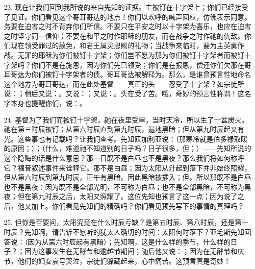 23. 现在让我们回到我所说的来自先知的证据。主被钉在十字架上；你们已经接受了见证。你们看见这个哥耳哥达的地点！你们以欢呼的喊声回应，仿佛表示同意。务要在迫害之时不背弃你们所信。不要只在平安之时以十字架为喜乐，也应在迫害之时坚守同一信仰；不要在和平之时作耶稣的朋友，而在战争之时作祂的仇敌。你们现在领受罪过的赦免，和君王属灵恩赐的礼物；当战争来临时，要为主英勇作战。无罪的耶稣为你们被钉十字架；你们岂不愿为那为你们被钉十字架者而被钉十字架吗？你们不是在施恩，因为你们先已领受；你们是在报恩，偿还你们欠那在哥耳哥达为你们被钉十字架者的债。哥耳哥达被解释为。那么，是谁曾预言性地命名这个地方为哥耳哥达，而在此处基督——真正的头——忍受了十字架？如宗徒所说：；稍后又说：。又说：；又说：。头在受了苦。哦，奇妙的预言性称谓！这名字本身也提醒你们，说：。\par

24. 基督为了我们而被钉十字架，祂在夜里受审，当时天冷，所以生了一盆炭火。祂在第三时辰被钉；从第六时辰直到第九时辰，遍地黑暗；但从第九时辰起又有光。这些事也有记载吗？让我们查考。先知匝加利亚说：（那寒冷就是伯多禄取暖的原因；）；（什么，难道祂不知道别的日子吗？日子很多，但；）——先知所说的这个隐晦的话是什么意思？那一日既不是白昼也不是黑夜？那么我们将如何称呼它？福音叙述事件来诠释它。那不是白昼；因为太阳从升起到落下并非始终照耀，但从第六时辰到第九时辰，正午有黑暗。因此黑暗被插入；但。所以那既不是白昼也不是黑夜：因为既不是全部光明，不可称为白昼；也不是全部黑暗，不可称为黑夜；但在第九时辰之后，太阳又照耀了。这位先知也预言了这一点；因为说了之后，他又加上。你们看见先知们的精确吗？你们看见预先写下的事情的真理吗？\par

25. 但你是否要问，太阳究竟在什么时辰亏缺？是第五时辰、第八时辰，还是第十时辰？先知啊，请告诉不愿听的犹太人确切的时间：太阳何时落下？亚毛斯先知回答说：（因为从第六时辰起有黑暗）；先知啊，这是什么样的季节，什么样的日子？；因为这事发生在无酵节和逾越节期间；随后他又说：；因为在无酵节和庆节，他们的妇女哀号哭泣，宗徒们躲藏起来，心中痛苦。这预言真是奇妙！\par

